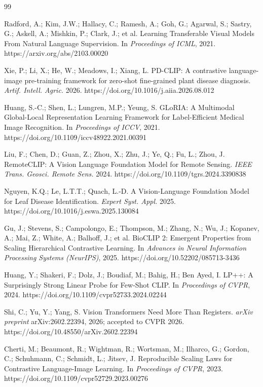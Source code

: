 \documentclass[10pt,a4paper]{article}
\begin{document}
\begin{thebibliography}{99}

Radford, A.; Kim, J.W.; Hallacy, C.; Ramesh, A.; Goh, G.; Agarwal, S.; Sastry, G.; Askell, A.; Mishkin, P.; Clark, J.; et al.
Learning Transferable Visual Models From Natural Language Supervision.
In \emph{Proceedings of ICML}, 2021.
https://arxiv.org/abs/2103.00020

 Xie, P.; Li, X.; He, W.; Meadows, I.; Xiang, L.
 PD-CLIP: A contrastive language-image pre-training framework for zero-shot fine-grained plant disease diagnosis.
 \emph{Artif. Intell. Agric.} 2026.
 https://doi.org/10.1016/j.aiia.2026.08.012

Huang, S.-C.; Shen, L.; Lungren, M.P.; Yeung, S.
GLoRIA: A Multimodal Global-Local Representation Learning Framework for Label-Efficient Medical Image Recognition.
In \emph{Proceedings of ICCV}, 2021.
https://doi.org/10.1109/iccv48922.2021.00391

Liu, F.; Chen, D.; Guan, Z.; Zhou, X.; Zhu, J.; Ye, Q.; Fu, L.; Zhou, J.
RemoteCLIP: A Vision Language Foundation Model for Remote Sensing.
\emph{IEEE Trans. Geosci. Remote Sens.} 2024.
https://doi.org/10.1109/tgrs.2024.3390838

Nguyen, K.Q.; Le, L.T.T.; Quach, L.-D.
A Vision-Language Foundation Model for Leaf Disease Identification.
\emph{Expert Syst. Appl.} 2025.
https://doi.org/10.1016/j.eswa.2025.130084

Gu, J.; Stevens, S.; Campolongo, E.; Thompson, M.; Zhang, N.; Wu, J.; Kopanev, A.; Mai, Z.; White, A.; Balhoff, J.; et al.
BioCLIP 2: Emergent Properties from Scaling Hierarchical Contrastive Learning.
In \emph{Advances in Neural Information Processing Systems (NeurIPS)}, 2025.
https://doi.org/10.52202/085713-3436

Huang, Y.; Shakeri, F.; Dolz, J.; Boudiaf, M.; Bahig, H.; Ben Ayed, I.
LP++: A Surprisingly Strong Linear Probe for Few-Shot CLIP.
In \emph{Proceedings of CVPR}, 2024.
https://doi.org/10.1109/cvpr52733.2024.02244

Shi, C.; Yu, Y.; Yang, S.
Vision Transformers Need More Than Registers.
\emph{arXiv preprint} arXiv:2602.22394, 2026; accepted to CVPR 2026.
https://doi.org/10.48550/arXiv.2602.22394

Cherti, M.; Beaumont, R.; Wightman, R.; Wortsman, M.; Ilharco, G.; Gordon, C.; Schuhmann, C.; Schmidt, L.; Jitsev, J.
Reproducible Scaling Laws for Contrastive Language-Image Learning.
In \emph{Proceedings of CVPR}, 2023.
https://doi.org/10.1109/cvpr52729.2023.00276


\end{thebibliography}
\end{document}
